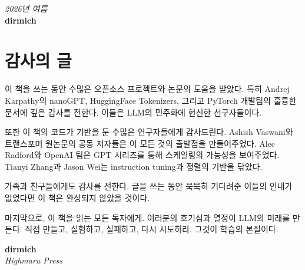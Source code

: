 \begin{flushright}
\textit{2026년 여름}\\[0.3em]
\textbf{dirmich}
\end{flushright}

\newpage

\section*{감사의 글}

이 책을 쓰는 동안 수많은 오픈소스 프로젝트와 논문의 도움을 받았다. 특히 Andrej Karpathy의 nanoGPT, HuggingFace Tokenizers, 그리고 PyTorch 개발팀의 훌륭한 문서에 깊은 감사를 전한다. 이들은 LLM의 민주화에 헌신한 선구자들이다.

또한 이 책의 코드가 기반을 둔 수많은 연구자들에게 감사드린다. Ashish Vaswani와 트랜스포머 원논문의 공동 저자들은 이 모든 것의 출발점을 만들어주었다. Alec Radford와 OpenAI 팀은 GPT 시리즈를 통해 스케일링의 가능성을 보여주었다. Tianyi Zhang과 Jason Wei는 instruction tuning과 정렬의 기반을 닦았다.

가족과 친구들에게도 감사를 전한다. 글을 쓰는 동안 묵묵히 기다려준 이들의 인내가 없었다면 이 책은 완성되지 않았을 것이다.

마지막으로, 이 책을 읽는 모든 독자에게. 여러분의 호기심과 열정이 LLM의 미래를 만든다. 직접 만들고, 실험하고, 실패하고, 다시 시도하라. 그것이 학습의 본질이다.

\begin{flushright}
\textbf{dirmich}\\
\textit{Highmaru Press}
\end{flushright}
